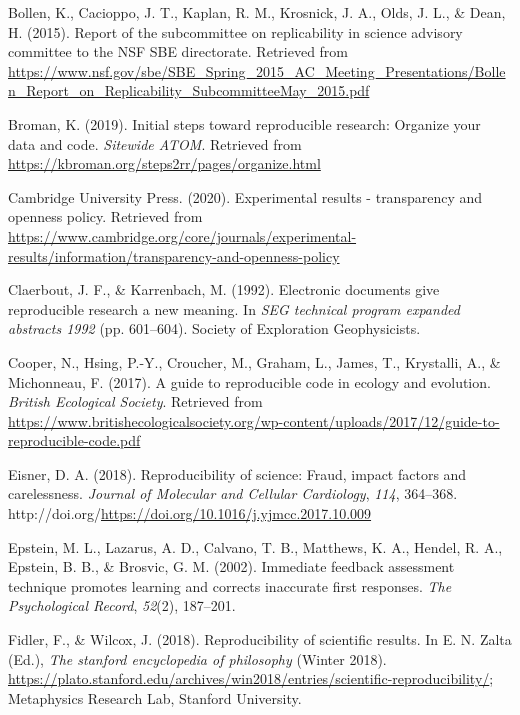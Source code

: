 \documentclass[12pt,twoside]{reedthesis}
\newenvironment{CSLReferences}%
  {}%
  {\par}
\begin{document}
\begin{CSLReferences}{1}{0}
\leavevmode\hypertarget{ref-arlington}{}%
Bollen, K., Cacioppo, J. T., Kaplan, R. M., Krosnick, J. A., Olds, J. L., \& Dean, H. (2015). Report of the subcommittee on replicability in science advisory committee to the NSF SBE directorate. Retrieved from \url{https://www.nsf.gov/sbe/SBE_Spring_2015_AC_Meeting_Presentations/Bollen_Report_on_Replicability_SubcommitteeMay_2015.pdf}

\leavevmode\hypertarget{ref-broman}{}%
Broman, K. (2019). Initial steps toward reproducible research: Organize your data and code. \emph{Sitewide ATOM}. Retrieved from \url{https://kbroman.org/steps2rr/pages/organize.html}

\leavevmode\hypertarget{ref-exp-results}{}%
Cambridge University Press. (2020). Experimental results - transparency and openness policy. Retrieved from \url{https://www.cambridge.org/core/journals/experimental-results/information/transparency-and-openness-policy}

\leavevmode\hypertarget{ref-claerbout}{}%
Claerbout, J. F., \& Karrenbach, M. (1992). Electronic documents give reproducible research a new meaning. In \emph{SEG technical program expanded abstracts 1992} (pp. 601--604). Society of Exploration Geophysicists.

\leavevmode\hypertarget{ref-cooper2017guide}{}%
Cooper, N., Hsing, P.-Y., Croucher, M., Graham, L., James, T., Krystalli, A., \& Michonneau, F. (2017). A guide to reproducible code in ecology and evolution. \emph{British Ecological Society}. Retrieved from \url{https://www.britishecologicalsociety.org/wp-content/uploads/2017/12/guide-to-reproducible-code.pdf}

\leavevmode\hypertarget{ref-eisner-reproducibility}{}%
Eisner, D. A. (2018). Reproducibility of science: Fraud, impact factors and carelessness. \emph{Journal of Molecular and Cellular Cardiology}, \emph{114}, 364--368. http://doi.org/\url{https://doi.org/10.1016/j.yjmcc.2017.10.009}

\leavevmode\hypertarget{ref-epstein2002immediate}{}%
Epstein, M. L., Lazarus, A. D., Calvano, T. B., Matthews, K. A., Hendel, R. A., Epstein, B. B., \& Brosvic, G. M. (2002). Immediate feedback assessment technique promotes learning and corrects inaccurate first responses. \emph{The Psychological Record}, \emph{52}(2), 187--201.

\leavevmode\hypertarget{ref-sep-scientific-reproducibility}{}%
Fidler, F., \& Wilcox, J. (2018). Reproducibility of scientific results. In E. N. Zalta (Ed.), \emph{The stanford encyclopedia of philosophy} (Winter 2018). \url{https://plato.stanford.edu/archives/win2018/entries/scientific-reproducibility/}; Metaphysics Research Lab, Stanford University.


\end{CSLReferences}
\end{document}
